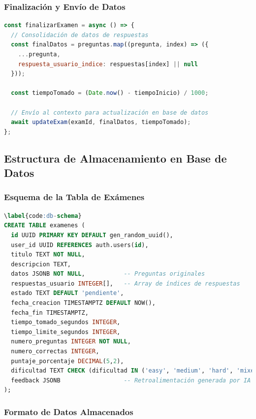 \documentclass[12pt,a4paper]{report}
\begin{document}
\subsubsection{Finalización y Envío de Datos}

\begin{lstlisting}[language=JavaScript, caption=Procesamiento al finalizar examen]
const finalizarExamen = async () => {
  // Consolidación de datos de respuestas
  const finalDatos = preguntas.map((pregunta, index) => ({
    ...pregunta,
    respuesta_usuario_indice: respuestas[index] || null
  }));

  const tiempoTomado = (Date.now() - tiempoInicio) / 1000;
  
  // Envío al contexto para actualización en base de datos
  await updateExam(examId, finalDatos, tiempoTomado);
};
\end{lstlisting}

\subsection{Estructura de Almacenamiento en Base de Datos}

\subsubsection{Esquema de la Tabla de Exámenes}

\begin{lstlisting}[language=SQL, caption={Código \ref{code:db-schema}: Esquema de base de datos para exámenes}]
\label{code:db-schema}
CREATE TABLE examenes (
  id UUID PRIMARY KEY DEFAULT gen_random_uuid(),
  user_id UUID REFERENCES auth.users(id),
  titulo TEXT NOT NULL,
  descripcion TEXT,
  datos JSONB NOT NULL,           -- Preguntas originales
  respuestas_usuario INTEGER[],   -- Array de índices de respuestas
  estado TEXT DEFAULT 'pendiente',
  fecha_creacion TIMESTAMPTZ DEFAULT NOW(),
  fecha_fin TIMESTAMPTZ,
  tiempo_tomado_segundos INTEGER,
  tiempo_limite_segundos INTEGER,
  numero_preguntas INTEGER NOT NULL,
  numero_correctas INTEGER,
  puntaje_porcentaje DECIMAL(5,2),
  dificultad TEXT CHECK (dificultad IN ('easy', 'medium', 'hard', 'mixed')),
  feedback JSONB                  -- Retroalimentación generada por IA
);
\end{lstlisting}

\subsubsection{Formato de Datos Almacenados}
\end{document}
